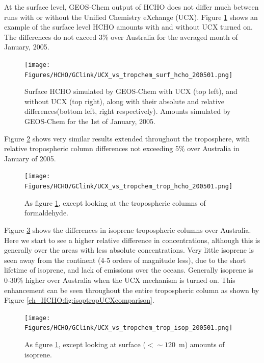     At the surface level, GEOS-Chem output of HCHO does not differ much between runs with or without the Unified Chemistry eXchange (UCX).
    Figure \ref{ch_HCHO:fig:HCHOsurfUCXcomparison} shows an example of the surface level HCHO amounts with and without UCX turned on.
    The differences do not exceed 3\% over Australia for the averaged month of January, 2005.
    
    \begin{figure}[!htbp]
      \texttt{[image: Figures/HCHO/GClink/UCX\_vs\_tropchem\_surf\_hcho\_200501.png]}
      \caption{ %
	Surface HCHO simulated by GEOS-Chem with UCX (top left), and without UCX (top right), along with their absolute and relative differences(bottom left, right respectively).
	Amounts simulated by GEOS-Chem for the 1st of January, 2005.
	}
      \label{ch_HCHO:fig:HCHOsurfUCXcomparison}
    \end{figure}
    
    Figure \ref{ch_HCHO:fig:HCHOtropcolUCXcomparison} shows very similar results extended throughout the troposphere, with relative tropospheric column differences not exceeding 5\% over Australia in January of 2005.
    
    \begin{figure}[!htbp]
      \texttt{[image: Figures/HCHO/GClink/UCX\_vs\_tropchem\_trop\_hcho\_200501.png]}
      \caption{ %
	As figure \ref{ch_HCHO:fig:HCHOsurfUCXcomparison}, except looking at the tropospheric columns of formaldehyde. 
	}      
      \label{ch_HCHO:fig:HCHOtropcolUCXcomparison}
    \end{figure}
    
    Figure \ref{ch_HCHO:fig:isopsurfUCXcomparison} shows the differences in isoprene tropospheric columns over Australia.
    Here we start to see a higher relative difference in concentrations, although this is generally over the areas with less absolute concentrations. 
    Very little isoprene is seen away from the continent (4-5 orders of magnitude less), due to the short lifetime of isoprene, and lack of emissions over the oceans.
    Generally isoprene is 0-30\% higher over Australia when the UCX mechanism is turned on.
    This enhancement can be seen throughout the entire tropospheric column as shown by Figure \ref{ch_HCHO:fig:isoptropUCXcomparison}.
    
    \begin{figure}[!htbp]
      \texttt{[image: Figures/HCHO/GClink/UCX\_vs\_tropchem\_trop\_isop\_200501.png]}
      \caption{%
	As figure \ref{ch_HCHO:fig:HCHOsurfUCXcomparison}, except looking at surface ($ < \sim 120$~m) amounts of isoprene.
      }
      \label{ch_HCHO:fig:isopsurfUCXcomparison}
    \end{figure}
    

